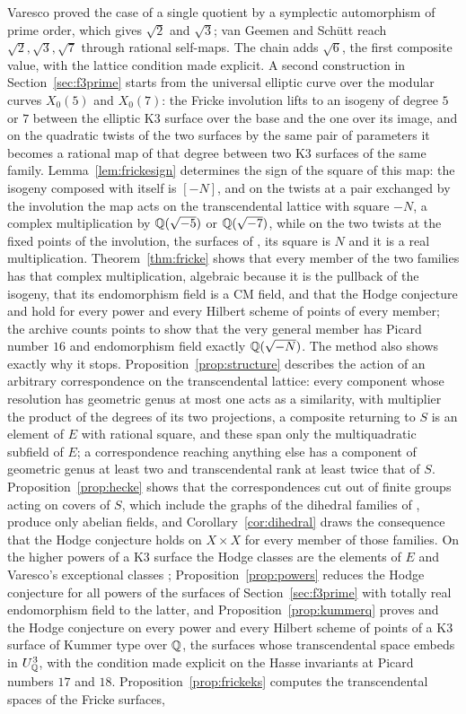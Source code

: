 Varesco \cite{Var23} proved the case of a single quotient by a symplectic automorphism of prime order, which gives $\sqrt2$ and $\sqrt3$; van Geemen and Sch\"utt \cite{vGS25} reach $\sqrt2,\sqrt3,\sqrt7$ through rational self-maps. The chain adds $\sqrt6$, the first composite value, with the lattice condition made explicit. A second construction in Section~\ref{sec:f3prime} starts from the universal elliptic curve over the modular curves $X_{0}(5)$ and $X_{0}(7)$: the Fricke involution lifts to an isogeny of degree $5$ or $7$ between the elliptic K3 surface over the base and the one over its image, and on the quadratic twists of the two surfaces by the same pair of parameters it becomes a rational map of that degree between two K3 surfaces of the same family. Lemma~\ref{lem:frickesign} determines the sign of the square of this map: the isogeny composed with itself is $[-N]$, and on the twists at a pair exchanged by the involution the map acts on the transcendental lattice with square $-N$, a complex multiplication by $\mathbb{Q}(\sqrt{-5})$ or $\mathbb{Q}(\sqrt{-7})$, while on the two twists at the fixed points of the involution, the surfaces of \cite{vGS25}, its square is $N$ and it is a real multiplication. Theorem~\ref{thm:fricke} shows that every member of the two families has that complex multiplication, algebraic because it is the pullback of the isogeny, that its endomorphism field is a CM field, and that the Hodge conjecture and \Fiii{} hold for every power and every Hilbert scheme of points of every member; the archive counts points to show that the very general member has Picard number $16$ and endomorphism field exactly $\mathbb{Q}(\sqrt{-N})$. The method also shows exactly why it stops. Proposition~\ref{prop:structure} describes the action of an arbitrary correspondence on the transcendental lattice: every component whose resolution has geometric genus at most one acts as a similarity, with multiplier the product of the degrees of its two projections, a composite returning to $S$ is an element of $E$ with rational square, and these span only the multiquadratic subfield of $E$; a correspondence reaching anything else has a component of geometric genus at least two and transcendental rank at least twice that of $S$. Proposition~\ref{prop:hecke} shows that the correspondences cut out of finite groups acting on covers of $S$, which include the graphs of the dihedral families of \cite{vGS25}, produce only abelian fields, and Corollary~\ref{cor:dihedral} draws the consequence that the Hodge conjecture holds on $X\times X$ for every member of those families. On the higher powers of a K3 surface the Hodge classes are the elements of $E$ and Varesco's exceptional classes \cite{Var25}; Proposition~\ref{prop:powers} reduces the Hodge conjecture for all powers of the surfaces of Section~\ref{sec:f3prime} with totally real endomorphism field to the latter, and Proposition~\ref{prop:kummerq} proves \Fiii{} and the Hodge conjecture on every power and every Hilbert scheme of points of a K3 surface of Kummer type over $\mathbb{Q}$, the surfaces whose transcendental space embeds in $U_{\mathbb{Q}}^{3}$, with the condition made explicit on the Hasse invariants at Picard numbers $17$ and $18$. Proposition~\ref{prop:frickeks} computes the transcendental spaces of the Fricke surfaces, 